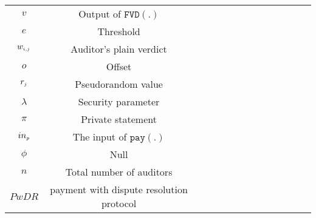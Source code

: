 \begin{table}[!htbp]
\begin{scriptsize}
\begin{center}
{{\begin{tabular}{|c|c|c|c|c|c|c|c|c|c|c|c|c|c|}
%
\cellcolor{gray!20}\scriptsize$v$ &\cellcolor{gray!20}\scriptsize  Output of $\mathtt{FVD}(.)$\\ 
%
\cellcolor{white!20}\scriptsize$e$ &\cellcolor{white!20}\scriptsize  Threshold\\ 
%            
 \cellcolor{gray!20}\scriptsize$w_{\scriptscriptstyle i,j}$ &\cellcolor{gray!20}\scriptsize  Auditor's plain verdict\\ 
%     
\cellcolor{white!20}\scriptsize$o$ &\cellcolor{white!20}\scriptsize  Offset\\  
  \cellcolor{gray!20}\scriptsize$r_{\scriptscriptstyle j}$ &\cellcolor{gray!20}\scriptsize  Pseudorandom value\\   
\cellcolor{white!20}\scriptsize$\lambda$ &\cellcolor{white!20}\scriptsize Security parameter\\  
%


                
%
\cellcolor{gray!20}\scriptsize$\pi$ &\cellcolor{gray!20}\scriptsize Private statement\\        
\cellcolor{white!20}\scriptsize$in_{\scriptscriptstyle p}$ &\cellcolor{white!20}\scriptsize The input of $\mathtt{pay}(.)$\\    
%
\cellcolor{gray!20}\scriptsize$\phi$ &\cellcolor{gray!20}\scriptsize  Null\\ 
%
\cellcolor{white!20}\scriptsize$n$ &\cellcolor{white!20}\scriptsize  Total number of auditors\\  
%           
%
%
%
\cellcolor{gray!20}\scriptsize$PwDR$ &\cellcolor{gray!20}\scriptsize  payment with dispute resolution protocol\\ 
\hline 

      

           
              
\end{tabular}\label{table:notation-table}
%
}
}
\end{center}
\end{scriptsize}
\end{table}

